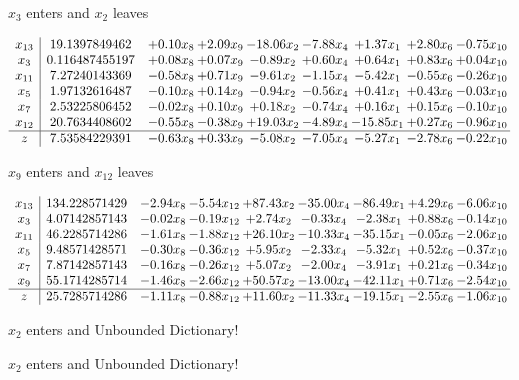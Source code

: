 \documentclass[9pt]{article}
\begin{document}
 $ x_{3} $ enters and $ x_{2} $ leaves 

 \[\begin{array}{c| c c@{\hskip 2pt} c@{\hskip 2pt} c@{\hskip 2pt} c@{\hskip 2pt} c@{\hskip 2pt} c@{\hskip 2pt} c@{\hskip 2pt} }
 x_{13}   &  19.1397849462 & +  0.10 x_{8} & +  2.09 x_{9} & -18.06 x_{2} & -7.88 x_{4} & +  1.37 x_{1} & +  2.80 x_{6} & -0.75 x_{10}\\
 x_{3}   &  0.116487455197 & +  0.08 x_{8} & +  0.07 x_{9} & -0.89 x_{2} & +  0.60 x_{4} & +  0.64 x_{1} & +  0.83 x_{6} & +  0.04 x_{10}\\
 x_{11}   &  7.27240143369 & -0.58 x_{8} & +  0.71 x_{9} & -9.61 x_{2} & -1.15 x_{4} & -5.42 x_{1} & -0.55 x_{6} & -0.26 x_{10}\\
 x_{5}   &  1.97132616487 & -0.10 x_{8} & +  0.14 x_{9} & -0.94 x_{2} & -0.56 x_{4} & +  0.41 x_{1} & +  0.43 x_{6} & -0.03 x_{10}\\
 x_{7}   &  2.53225806452 & -0.02 x_{8} & +  0.10 x_{9} & +  0.18 x_{2} & -0.74 x_{4} & +  0.16 x_{1} & +  0.15 x_{6} & -0.10 x_{10}\\
 x_{12}   &  20.7634408602 & -0.55 x_{8} & -0.38 x_{9} & + 19.03 x_{2} & -4.89 x_{4} & -15.85 x_{1} & +  0.27 x_{6} & -0.96 x_{10}\\
\hline
z    &  7.53584229391 & -0.63 x_{8} & +  0.33 x_{9} & -5.08 x_{2} & -7.05 x_{4} & -5.27 x_{1} & -2.78 x_{6} & -0.22 x_{10}\\
\end{array}\]


 $ x_{9} $ enters and $ x_{12} $ leaves 

 \[\begin{array}{c| c c@{\hskip 2pt} c@{\hskip 2pt} c@{\hskip 2pt} c@{\hskip 2pt} c@{\hskip 2pt} c@{\hskip 2pt} c@{\hskip 2pt} }
 x_{13}   &  134.228571429 & -2.94 x_{8} & -5.54 x_{12} & + 87.43 x_{2} & -35.00 x_{4} & -86.49 x_{1} & +  4.29 x_{6} & -6.06 x_{10}\\
 x_{3}   &  4.07142857143 & -0.02 x_{8} & -0.19 x_{12} & +  2.74 x_{2} & -0.33 x_{4} & -2.38 x_{1} & +  0.88 x_{6} & -0.14 x_{10}\\
 x_{11}   &  46.2285714286 & -1.61 x_{8} & -1.88 x_{12} & + 26.10 x_{2} & -10.33 x_{4} & -35.15 x_{1} & -0.05 x_{6} & -2.06 x_{10}\\
 x_{5}   &  9.48571428571 & -0.30 x_{8} & -0.36 x_{12} & +  5.95 x_{2} & -2.33 x_{4} & -5.32 x_{1} & +  0.52 x_{6} & -0.37 x_{10}\\
 x_{7}   &  7.87142857143 & -0.16 x_{8} & -0.26 x_{12} & +  5.07 x_{2} & -2.00 x_{4} & -3.91 x_{1} & +  0.21 x_{6} & -0.34 x_{10}\\
 x_{9}   &  55.1714285714 & -1.46 x_{8} & -2.66 x_{12} & + 50.57 x_{2} & -13.00 x_{4} & -42.11 x_{1} & +  0.71 x_{6} & -2.54 x_{10}\\
\hline
z    &  25.7285714286 & -1.11 x_{8} & -0.88 x_{12} & + 11.60 x_{2} & -11.33 x_{4} & -19.15 x_{1} & -2.55 x_{6} & -1.06 x_{10}\\
\end{array}\]


 $ x_{2} $ enters and Unbounded Dictionary!


 $ x_{2} $ enters and Unbounded Dictionary!
\end{document}
